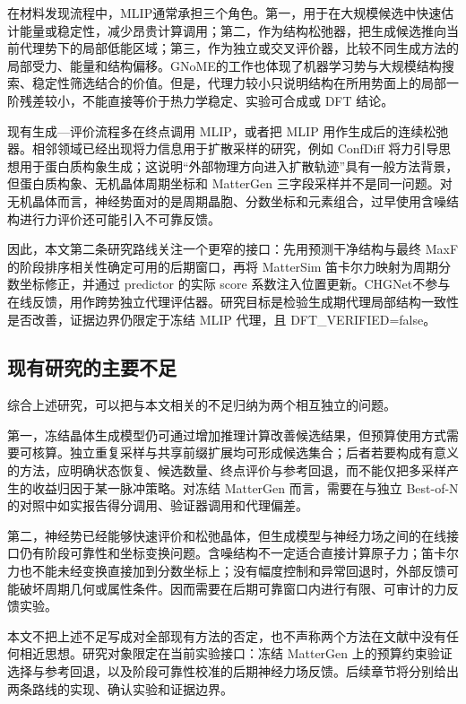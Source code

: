 在材料发现流程中，MLIP通常承担三个角色。第一，用于在大规模候选中快速估计能量或稳定性，减少昂贵计算调用；第二，作为结构松弛器，把生成候选推向当前代理势下的局部低能区域；第三，作为独立或交叉评价器，比较不同生成方法的局部受力、能量和结构偏移。GNoME的工作也体现了机器学习势与大规模结构搜索、稳定性筛选结合的价值\citep{merchant2023}。但是，代理力较小只说明结构在所用势面上的局部一阶残差较小，不能直接等价于热力学稳定、实验可合成或 DFT 结论。

现有生成---评价流程多在终点调用 MLIP，或者把 MLIP 用作生成后的连续松弛器。相邻领域已经出现将力信息用于扩散采样的研究，例如 ConfDiff 将力引导思想用于蛋白质构象生成\citep{wang2024}；这说明``外部物理方向进入扩散轨迹''具有一般方法背景，但蛋白质构象、无机晶体周期坐标和 MatterGen 三字段采样并不是同一问题。对无机晶体而言，神经势面对的是周期晶胞、分数坐标和元素组合，过早使用含噪结构进行力评价还可能引入不可靠反馈。

因此，本文第二条研究路线关注一个更窄的接口：先用预测干净结构与最终 MaxF 的阶段排序相关性确定可用的后期窗口，再将 Matter\allowbreak Sim 笛卡尔力映射为周期分数坐标修正，并通过 predictor 的实际 score 系数注入位置更新。CHGNet不参与在线反馈，用作跨势独立代理评估器。研究目标是检验生成期代理局部结构一致性是否改善，证据边界仍限定于冻结 MLIP 代理，且 DFT\_VERIFIED=false。

\subsection{现有研究的主要不足}

综合上述研究，可以把与本文相关的不足归纳为两个相互独立的问题。

第一，冻结晶体生成模型仍可通过增加推理计算改善候选结果，但预算使用方式需要可核算。独立重复采样与共享前缀扩展均可形成候选集合；后者若要构成有意义的方法，应明确状态恢复、候选数量、终点评价与参考回退，而不能仅把多采样产生的收益归因于某一脉冲策略。对冻结 MatterGen 而言，需要在与独立 Best-of-N 的对照中如实报告得分调用、验证器调用和代理偏差。

第二，神经势已经能够快速评价和松弛晶体，但生成模型与神经力场之间的在线接口仍有阶段可靠性和坐标变换问题。含噪结构不一定适合直接计算原子力；笛卡尔力也不能未经变换直接加到分数坐标上；没有幅度控制和异常回退时，外部反馈可能破坏周期几何或属性条件。因而需要在后期可靠窗口内进行有限、可审计的力反馈实验。

本文不把上述不足写成对全部现有方法的否定，也不声称两个方法在文献中没有任何相近思想。研究对象限定在当前实验接口：冻结 MatterGen 上的预算约束验证选择与参考回退，以及阶段可靠性校准的后期神经力场反馈。后续章节将分别给出两条路线的实现、确认实验和证据边界。

